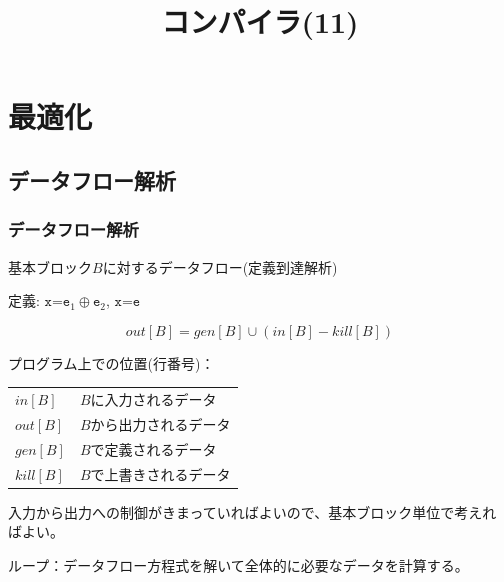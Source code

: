 \documentclass[dvipdfmx]{beamer}
\title{コンパイラ(11)}
\date{\lecturedate}
\begin{document}
\frame{\titlepage}

\section{最適化}

\subsection{データフロー解析}

\begin{frame}
  \frametitle{データフロー解析}


  基本ブロック$B$に対するデータフロー(定義到達解析)

  \vspace*{10pt}

  定義: $\texttt{x=e}_1\oplus\texttt{e}_2$, $\texttt{x=e}$


  \[
    out[B]=gen[B]\cup(in[B]-kill[B])
  \]

  プログラム上での位置(行番号)：
  \begin{tabular}{ll}
    $in[B]$   & $B$に入力されるデータ  \\
    $out[B]$  & $B$から出力されるデータ \\
    $gen[B]$  & $B$で定義されるデータ  \\
    $kill[B]$ & $B$で上書きされるデータ \\
  \end{tabular}

  入力から出力への制御がきまっていればよいので、基本ブロック単位で考えれ
  ばよい。

  ループ：データフロー方程式を解いて全体的に必要なデータを計算する。
\end{frame}
\end{document}
